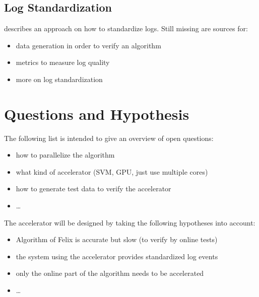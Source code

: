 \documentclass[12pt]{article} %
\begin{document}

\subsection{Log Standardization} %

\cite{IPDPS04_Salfner} describes an approach on how to standardize logs. Still
missing are sources for:
\begin{itemize}
    \item data generation in order to verify an algorithm
    \item metrics to measure log quality
    \item more on log standardization
\end{itemize}


\section{Questions and Hypothesis} %

The following list is intended to give an overview of open questions:
\begin{itemize}
    \item how to parallelize the algorithm
    \item what kind of accelerator (SVM, GPU, just use multiple cores)
    \item how to generate test data to verify the accelerator
    \item \dots
\end{itemize}

The accelerator will be designed by taking the following hypotheses into account:
\begin{itemize}
    \item Algorithm of Felix is accurate but slow (to verify by online tests)
    \item the system using the accelerator provides standardized log events
    \item only the online part of the algorithm needs to be accelerated
    \item \dots
\end{itemize}

\end{document}
